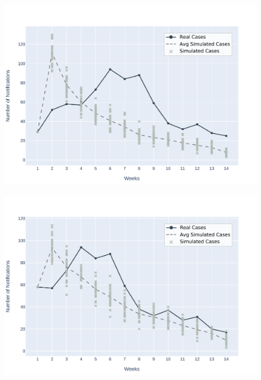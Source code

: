 \begin{figure}[!ht]
    \begin{minipage}[c]{.45\textwidth}
        \centering
        \includegraphics[scale=0.4]{images/experiments-lim/LIM-2020-06-21.pdf} \\
      \end{minipage}
    \hspace{0.5cm}
    \begin{minipage}[c]{.45\textwidth}
          \centering
          \includegraphics[scale=0.4]{images/experiments-lim/LIM-2020-07-05.pdf} \\
    \end{minipage}
    \\
    \begin{minipage}[c]{.45\textwidth}

\end{minipage}
\end{figure}
